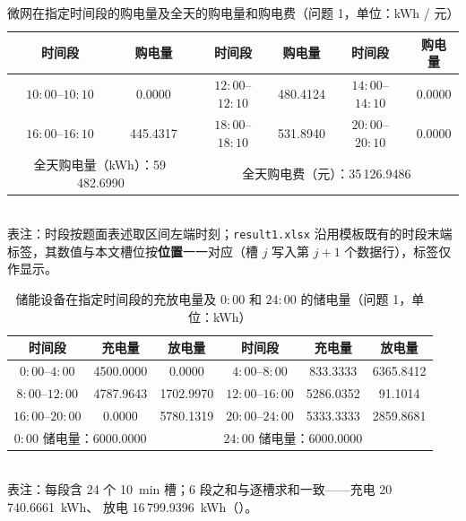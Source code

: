 \begin{table}[htbp]
  \centering
  \caption{微网在指定时间段的购电量及全天的购电量和购电费（问题 1，单位：\unit{kWh} / \unit{元}）}
  \label{tab:q1-buy}
  \small
  \begin{tabular}{cccccc}
    \toprule
    时间段 & 购电量 & 时间段 & 购电量 & 时间段 & 购电量 \\
    \midrule
    \(10{:}00\)--\(10{:}10\) & 0.0000 & \(12{:}00\)--\(12{:}10\) & 480.4124 & \(14{:}00\)--\(14{:}10\) & 0.0000 \\
    \(16{:}00\)--\(16{:}10\) & 445.4317 & \(18{:}00\)--\(18{:}10\) & 531.8940 & \(20{:}00\)--\(20{:}10\) & 0.0000 \\
    \midrule
    \multicolumn{2}{c}{全天购电量（\unit{kWh}）：59\,482.6990} &
    \multicolumn{4}{c}{全天购电费（\unit{元}）：35\,126.9486} \\
    \bottomrule
  \end{tabular}
  \\[1ex]
  {\footnotesize 表注：时段按题面表述取区间左端时刻；\texttt{result1.xlsx} 沿用模板既有的时段末端
  标签，其数值与本文槽位按\textbf{位置}一一对应（槽 \(j\) 写入第 \(j+1\) 个数据行），标签仅作显示。}
\end{table}

\begin{table}[htbp]
  \centering
  \caption{储能设备在指定时间段的充放电量及 \(0{:}00\) 和 \(24{:}00\) 的储电量（问题 1，单位：\unit{kWh}）}
  \label{tab:q1-soc}
  \small
  \begin{tabular}{cccccc}
    \toprule
    时间段 & 充电量 & 放电量 & 时间段 & 充电量 & 放电量 \\
    \midrule
    \(0{:}00\)--\(4{:}00\)   & 4500.0000 & 0.0000    & \(4{:}00\)--\(8{:}00\)   & 833.3333  & 6365.8412 \\
    \(8{:}00\)--\(12{:}00\)  & 4787.9643 & 1702.9970 & \(12{:}00\)--\(16{:}00\) & 5286.0352 & 91.1014 \\
    \(16{:}00\)--\(20{:}00\) & 0.0000    & 5780.1319 & \(20{:}00\)--\(24{:}00\) & 5333.3333 & 2859.8681 \\
    \midrule
    \multicolumn{2}{c}{\(0{:}00\) 储电量：6000.0000} &
    \multicolumn{4}{c}{\(24{:}00\) 储电量：6000.0000} \\
    \bottomrule
  \end{tabular}
  \\[1ex]
  {\footnotesize 表注：每段含 24 个 10~min 槽；6 段之和与逐槽求和一致——充电 20\,740.6661~kWh、
  放电 16\,799.9396~kWh（）。}
\end{table}

